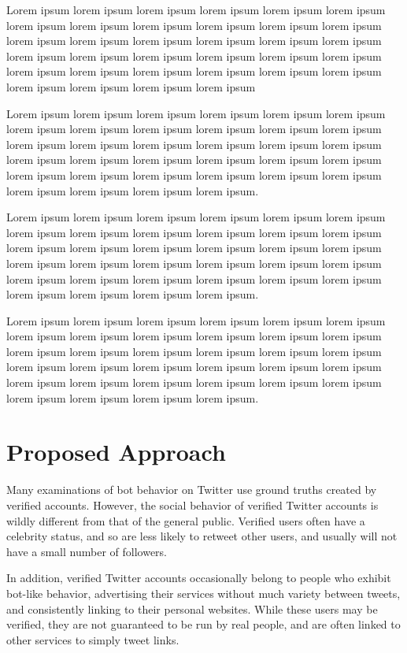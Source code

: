 \documentclass{sig-alternate-05-2015}
\begin{document}
Lorem ipsum lorem ipsum lorem ipsum lorem ipsum lorem ipsum lorem ipsum lorem ipsum lorem ipsum lorem ipsum lorem ipsum lorem ipsum lorem ipsum lorem ipsum lorem ipsum lorem ipsum lorem ipsum lorem ipsum lorem ipsum lorem ipsum lorem ipsum lorem ipsum lorem ipsum lorem ipsum lorem ipsum lorem ipsum lorem ipsum lorem ipsum lorem ipsum lorem ipsum lorem ipsum lorem ipsum lorem ipsum lorem ipsum lorem ipsum

Lorem ipsum lorem ipsum lorem ipsum lorem ipsum lorem ipsum lorem ipsum lorem ipsum lorem ipsum lorem ipsum lorem ipsum lorem ipsum lorem ipsum lorem ipsum lorem ipsum lorem ipsum lorem ipsum lorem ipsum lorem ipsum lorem ipsum lorem ipsum lorem ipsum lorem ipsum lorem ipsum lorem ipsum lorem ipsum lorem ipsum lorem ipsum lorem ipsum lorem ipsum lorem ipsum lorem ipsum lorem ipsum lorem ipsum lorem ipsum.

Lorem ipsum lorem ipsum lorem ipsum lorem ipsum lorem ipsum lorem ipsum lorem ipsum lorem ipsum lorem ipsum lorem ipsum lorem ipsum lorem ipsum lorem ipsum lorem ipsum lorem ipsum lorem ipsum lorem ipsum lorem ipsum lorem ipsum lorem ipsum lorem ipsum lorem ipsum lorem ipsum lorem ipsum lorem ipsum lorem ipsum lorem ipsum lorem ipsum lorem ipsum lorem ipsum lorem ipsum lorem ipsum lorem ipsum lorem ipsum.

Lorem ipsum lorem ipsum lorem ipsum lorem ipsum lorem ipsum lorem ipsum lorem ipsum lorem ipsum lorem ipsum lorem ipsum lorem ipsum lorem ipsum lorem ipsum lorem ipsum lorem ipsum lorem ipsum lorem ipsum lorem ipsum lorem ipsum lorem ipsum lorem ipsum lorem ipsum lorem ipsum lorem ipsum lorem ipsum lorem ipsum lorem ipsum lorem ipsum lorem ipsum lorem ipsum lorem ipsum lorem ipsum lorem ipsum lorem ipsum.

\section{Proposed Approach}
Many examinations of bot behavior on Twitter use ground truths created by verified accounts. However, the social behavior of verified Twitter accounts is wildly different from that of the general public. Verified users often have a celebrity status, and so are less likely to retweet other users, and usually will not have a small number of followers.

In addition, verified Twitter accounts occasionally belong to people who exhibit bot-like behavior, advertising their services without much variety between tweets, and consistently linking to their personal websites. While these users may be verified, they are not guaranteed to be run by real people, and are often linked to other services to simply tweet links.
\end{document}
